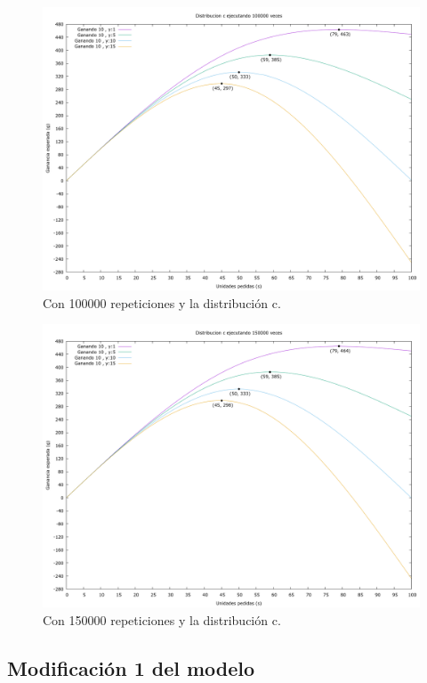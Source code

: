 \documentclass[12pt, spanish]{article}
\begin{document}
\begin{figure}[H]
	\centering
	\includegraphics[scale = 0.2]{prob_c/datos_c_100000.png}
	\caption{Con 100000 repeticiones y la distribución c.}
	\label{fig:ej1_a_100000}

\end{figure}

\begin{figure}[H]
	\centering
	\includegraphics[scale = 0.2]{prob_c/datos_c_150000.png}
	\caption{Con 150000 repeticiones y la distribución c.}
	\label{fig:ej1_a_150000}

\end{figure}


\subsection{Modificación 1 del modelo}
\end{document}
